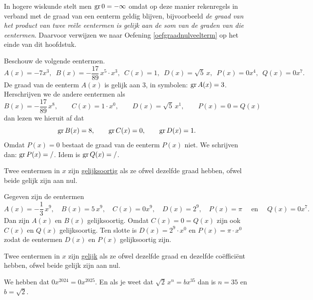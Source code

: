 \documentclass{ximera}
\begin{document}
\medskip

\begin{Uitbreiding}
In hogere wiskunde stelt men $\operatorname{gr} 0 = - \infty$ omdat op deze manier rekenregels in verband met de graad van een eenterm geldig blijven, bijvoorbeeld 
{\em de graad van het product van twee re\"ele eentermen is gelijk aan de som van de graden van die eentermen}. Daarvoor verwijzen we naar Oefening \ref{oefgraadnulveelterm} op het einde van dit hoofdstuk.
\end{Uitbreiding}

\begin{example}
Beschouw de volgende eentermen.
\[
A(x) = -7x^3, \,\,\, B(x) = -\frac{17}{89}\,x^5\cdot x^3, \,\,\, C(x) = 1, \,\,\, D(x) = \sqrt{5}\,x, \,\,\, P(x) = 0 x^4, \,\,\,  Q(x) = 0 x^7.
\]
De graad van de eenterm $A(x)$ is gelijk aan $3$, in symbolen: $\operatorname{gr} A(x) = 3$. Herschrijven we de andere eentermen als
\[
B(x) = -\frac{17}{89}\,x^8, \qquad C(x) = 1\cdot x^0, \qquad D(x) = \sqrt{5}\,x^1, \qquad P(x) = 0 = Q(x)
\]
dan lezen we hieruit af dat 
\[
\operatorname{gr} B(x) = 8, \qquad \operatorname{gr} C(x) = 0, \qquad \operatorname{gr} D(x) = 1. 
\]
Omdat $P(x) = 0$ bestaat de graad van de eenterm $P(x)$ niet. We schrijven dan: $\operatorname{gr} P(x) = /$. Idem is $\operatorname{gr} Q(x) = /$.
\end{example}

Twee eentermen in $x$ zijn \underline{gelijksoortig} als ze ofwel dezelfde graad hebben, ofwel beide gelijk zijn aan nul.

\begin{example}
Gegeven zijn de eentermen
\[
A(x) = -\frac{1}{3}\,x^9, \quad B(x) = 5\,x^9, \quad C(x) = 0x^9, \quad D(x) = 2^9, \quad P(x) = \pi \quad \text{ en } \quad Q(x) = 0 x^7.
\]
Dan zijn $A(x)$ en $B(x)$ gelijksoortig. Omdat $C(x) = 0 = Q(x)$ zijn ook $C(x)$ en $Q(x)$ gelijksoortig. Ten slotte is $D(x) = 2^9 \cdot x^0$ en $P(x) = \pi \cdot x^0$ zodat de eentermen $D(x)$ en $P(x)$ gelijksoortig zijn.  
\end{example}

Twee eentermen in $x$ zijn \underline{gelijk} als ze ofwel dezelfde graad en dezelfde co\"effici\"ent hebben, ofwel beide gelijk zijn aan nul.

\begin{example}
We hebben dat $0x^{2024} = 0x^{2025}$. En als je weet dat $\sqrt{2}\,x^n = bx^{35}$ dan is $n = 35$ en $b = \sqrt{2}$.
\end{example}


\end{document}
